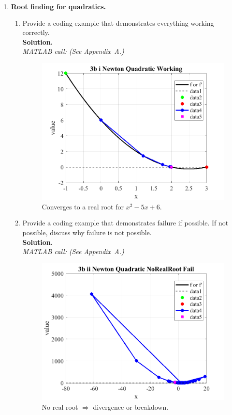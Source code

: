 \documentclass[11pt]{article}
\begin{document}
\begin{enumerate}[label=3(\alph*)]
\begin{enumerate}[label=\roman*)]
		\end{enumerate}
		
		\item \textbf{Root finding for quadratics.}
		\begin{enumerate}[label=\roman*)]
			
			\item Provide a coding example that demonstrates everything working correctly.\\
			\textbf{Solution.}\\
			\textit{MATLAB call:} \emph{(See Appendix~A.)}
			
			\begin{figure}[H]\centering
				\includegraphics[width=0.78\linewidth]{plots/3b_i_Newton_Quadratic_Working.png}
				\caption{Converges to a real root for \(x^2-5x+6\).}
			\end{figure}
			
			\item Provide a coding example that demonstrates failure if possible. If not possible, discuss why failure is not possible.\\
			\textbf{Solution.}\\
			\textit{MATLAB call:} \emph{(See Appendix~A.)}
			
			\begin{figure}[H]\centering
				\includegraphics[width=0.78\linewidth]{plots/3b_ii_Newton_Quadratic_NoRealRoot_Fail.png}
				\caption{No real root \(\Rightarrow\) divergence or breakdown.}
			\end{figure}
			

\end{enumerate}
\end{enumerate}
\end{document}
